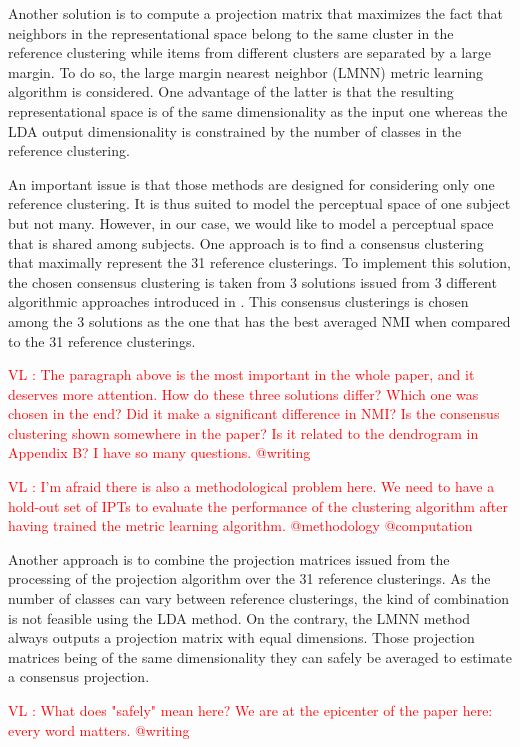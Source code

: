 \documentclass{article}
\newcommand{\vl}[1]{\textcolor{red}{VL : #1}}
\begin{document}
Another solution is to compute a projection matrix that maximizes the fact that neighbors in the representational space belong to the same cluster in the reference clustering while items from different clusters are separated by a large margin. To do so, the large margin nearest neighbor (LMNN) metric learning algorithm \cite{weinberger2006distance, weinberger2009distance} is considered. One advantage of the latter is that the resulting representational space is of the same dimensionality as the input one whereas the LDA output dimensionality is constrained by the number of classes in the reference clustering.

An important issue is that those methods are designed for considering only one reference clustering. It is thus suited to model the perceptual space of one subject but not many. However, in our case, we would like to model a perceptual space that is shared among subjects. One approach is to find a consensus clustering that maximally represent the 31 reference clusterings. To implement this solution, the chosen consensus clustering is taken from 3 solutions issued from 3 different algorithmic approaches introduced in \cite{strehl2002cluster}. This consensus clusterings is chosen among the 3 solutions as the one that has the best averaged NMI when compared to the 31 reference clusterings.

\vl{The paragraph above is the most important in the whole paper, and it deserves more attention. How do these three solutions differ? Which one was chosen in the end? Did it make a significant difference in NMI? Is the consensus clustering shown somewhere in the paper? Is it related to the dendrogram in Appendix B? I have so many questions. @writing}

\vl{I'm afraid there is also a methodological problem here.
We need to have a hold-out set of IPTs to evaluate the performance of the clustering algorithm after having trained the metric learning algorithm.
@methodology @computation}

Another approach is to combine the projection matrices issued from the processing of the projection algorithm over the 31 reference clusterings. As the number of classes can vary between reference clusterings, the kind of combination is not feasible using the LDA method. On the contrary, the LMNN method always outputs a projection matrix with equal dimensions. Those projection matrices being of the same dimensionality they can safely be averaged to estimate a consensus projection.

\vl{What does "safely" mean here? We are at the epicenter of the paper here: every word matters. @writing}
\end{document}
